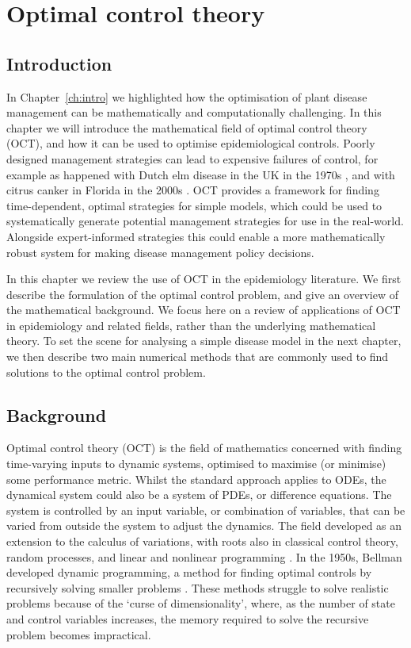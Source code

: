 %
\chapter{Optimal control theory}\label{ch:oct}

\section{Introduction}\label{sec:ch2:intro}

In Chapter~\ref{ch:intro} we highlighted how the optimisation of plant disease management can be mathematically and computationally challenging. In this chapter we will introduce the mathematical field of optimal control theory (OCT), and how it can be used to optimise epidemiological controls. Poorly designed management strategies can lead to expensive failures of control, for example as happened with Dutch elm disease in the UK in the 1970s \citep{tomlinson_too_2010}, and with citrus canker in Florida in the 2000s \citep{gottwald_citrus_2007}. OCT provides a framework for finding time-dependent, optimal strategies for simple models, which could be used to systematically generate potential management strategies for use in the real-world. Alongside expert-informed strategies this could enable a more mathematically robust system for making disease management policy decisions.

In this chapter we review the use of OCT in the epidemiology literature. We first describe the formulation of the optimal control problem, and give an overview of the mathematical background. We focus here on a review of applications of OCT in epidemiology and related fields, rather than the underlying mathematical theory. To set the scene for analysing a simple disease model in the next chapter, we then describe two main numerical methods that are commonly used to find solutions to the optimal control problem.

\section{Background}\label{sec:ch2:background}

Optimal control theory (OCT) is the field of mathematics concerned with finding time-varying inputs to dynamic systems, optimised to maximise (or minimise) some performance metric. Whilst the standard approach applies to ODEs,  the dynamical system could also be a system of PDEs, or difference equations. The system is controlled by an input variable, or combination of variables, that can be varied from outside the system to adjust the dynamics. The field developed as an extension to the calculus of variations, with roots also in classical control theory, random processes, and linear and nonlinear programming \citep{bryson_optimal_1996}. In the 1950s, Bellman developed dynamic programming, a method for finding optimal controls by recursively solving smaller problems \citep{bellman_dynamic_1957}. These methods struggle to solve realistic problems because of the `curse of dimensionality', where, as the number of state and control variables increases, the memory required to solve the recursive problem becomes impractical.


